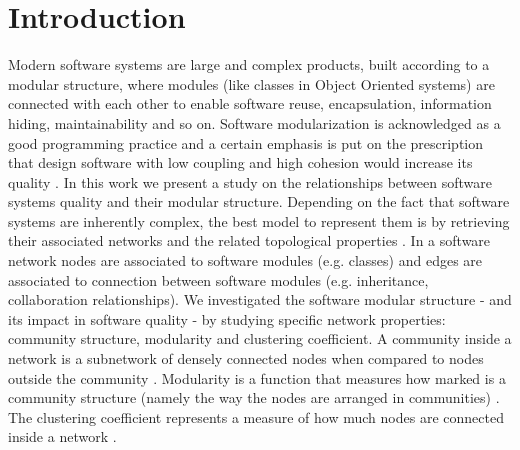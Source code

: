 
\section{Introduction}
\label{sec:introduction}

Modern software systems are large and complex products, built according to a modular structure, where 
modules (like classes in Object Oriented systems) are connected with each other 
to enable software reuse, encapsulation, information hiding, maintainability and so on. 
Software modularization is acknowledged as a good programming practice \cite{Parnas:1972, Baldwin:1999, Sanchez:1996} 
and a certain emphasis is put on the prescription that design software with low coupling and high 
cohesion would increase its quality \cite{Chidamber:1994}.  
In this work we present a study on the relationships between software systems quality and their modular structure.
Depending on the fact that software systems are inherently complex, 
the best model to represent them is by retrieving their associated networks 
and the related topological 
properties \cite{Myers:2003, Subelj:2011, Wen:2008, Subelj:2014, Zimmermann:2008}.
In a software network nodes are associated to software modules (e.g. classes) and
edges are associated to connection between software modules (e.g. inheritance, collaboration relationships).
We investigated the software modular structure - and its impact in software quality - 
by studying specific network properties: community structure, modularity and clustering coefficient.
A community inside a network is a subnetwork of densely connected nodes when 
compared to nodes outside the community \cite{Girvan:2002}. 
Modularity is a function that measures how marked is a community structure 
(namely the way the nodes are arranged in communities) \cite{NG:2004}.
The clustering coefficient represents a measure of how much nodes are connected  inside a network \cite{Newman:2003}. 



